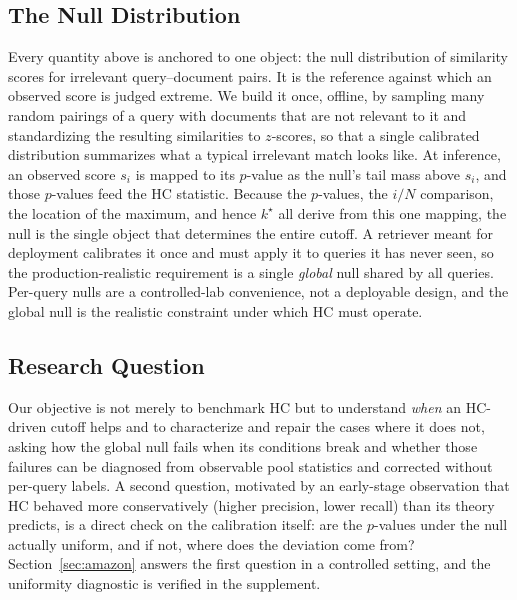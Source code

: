 \documentclass[letterpaper]{article} %
\begin{document}
\subsection{The Null Distribution}
Every quantity above is anchored to one object: the null distribution of
similarity scores for irrelevant query--document pairs. It is the
reference against which an observed score is judged extreme. We build it
once, offline, by sampling many random pairings of a query with documents
that are not relevant to it and standardizing the resulting similarities
to $z$-scores, so that a single calibrated distribution summarizes what a
typical irrelevant match looks like. At inference, an observed score
$s_i$ is mapped to its $p$-value as the null's tail mass above $s_i$, and
those $p$-values feed the HC statistic. Because the $p$-values, the $i/N$
comparison, the location of the maximum, and hence $k^\star$ all derive
from this one mapping, the null is the single object that determines the
entire cutoff. A retriever meant for deployment calibrates it once and
must apply it to queries it has never seen, so the production-realistic
requirement is a single \emph{global} null shared by all queries.
Per-query nulls are a controlled-lab convenience, not a deployable
design, and the global null is the realistic constraint under which HC
must operate.

\subsection{Research Question}
Our objective is not merely to benchmark HC but to understand
\emph{when} an HC-driven cutoff helps and to characterize and repair the
cases where it does not, asking how the global null fails when its
conditions break and whether those failures can be diagnosed from
observable pool statistics and corrected without per-query labels. A
second question, motivated by an early-stage observation that HC behaved
more conservatively (higher precision, lower recall) than its theory
predicts, is a direct check on the calibration itself: are the $p$-values
under the null actually uniform, and if not, where does the deviation
come from? Section~\ref{sec:amazon} answers the first question in a
controlled setting, and the uniformity diagnostic is verified in the
supplement.
\end{document}
